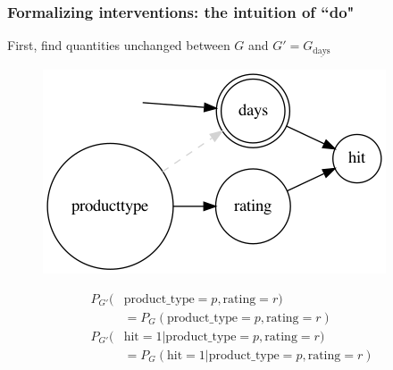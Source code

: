 \begin{frame}
\frametitle{Formalizing interventions: the intuition of ``do"}
	First, find quantities unchanged between $G$ and $G' = G_{\underline{\textrm{days}}}$
         \begin{figure}[ht]
             \includegraphics[height=0.5\textheight]{graphics/do_days}
        \end{figure}
        \vspace{-0.5cm}
        \begin{align}
        P_{G'}( & \textrm{product\_type} = p, \textrm{rating} = r) \nonumber \\
        & = P_G( \textrm{product\_type} = p, \textrm{rating} = r) \\
        P_{G'}(&\textrm{hit}=1 | \textrm{product\_type} = p, \textrm{rating} = r) \nonumber  \\
        & = P_G(\textrm{hit}=1 | \textrm{product\_type} = p, \textrm{rating} = r)
        \end{align}
\end{frame}


